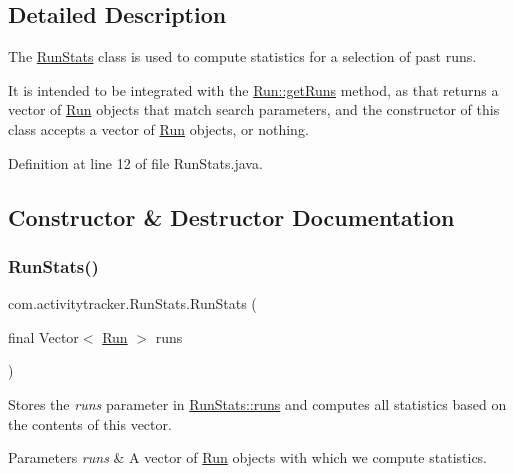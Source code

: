 \subsection{Detailed Description}
The \mbox{\hyperlink{classcom_1_1activitytracker_1_1_run_stats}{Run\+Stats}} class is used to compute statistics for a selection of past runs.

It is intended to be integrated with the \mbox{\hyperlink{classcom_1_1activitytracker_1_1_run_a1aa1fb01eabff586e16d88f19f7df743}{Run\+::get\+Runs}} method, as that returns a vector of \mbox{\hyperlink{classcom_1_1activitytracker_1_1_run}{Run}} objects that match search parameters, and the constructor of this class accepts a vector of \mbox{\hyperlink{classcom_1_1activitytracker_1_1_run}{Run}} objects, or nothing. 

Definition at line 12 of file Run\+Stats.\+java.



\subsection{Constructor \& Destructor Documentation}
\mbox{\label{classcom_1_1activitytracker_1_1_run_stats_a9c29c9a218ea2b01cfa42787b3c85f7c}} 
\subsubsection{\texorpdfstring{RunStats()}{RunStats()}\hspace{0.1cm}{\footnotesize\ttfamily [1/2]}}
{\footnotesize\ttfamily com.\+activitytracker.\+Run\+Stats.\+Run\+Stats (\begin{DoxyParamCaption}\item[{final Vector$<$ \mbox{\hyperlink{classcom_1_1activitytracker_1_1_run}{Run}} $>$}]{runs }\end{DoxyParamCaption})\hspace{0.3cm}{\ttfamily [package]}}

Stores the {\itshape runs} parameter in \mbox{\hyperlink{classcom_1_1activitytracker_1_1_run_stats_a0fd429e9f463ddf4897c507c0e3c0a12}{Run\+Stats\+::runs}} and computes all statistics based on the contents of this vector.


\begin{DoxyParams}{Parameters}
{\em runs} & A vector of \mbox{\hyperlink{classcom_1_1activitytracker_1_1_run}{Run}} objects with which we compute statistics. \\
\hline
\end{DoxyParams}



